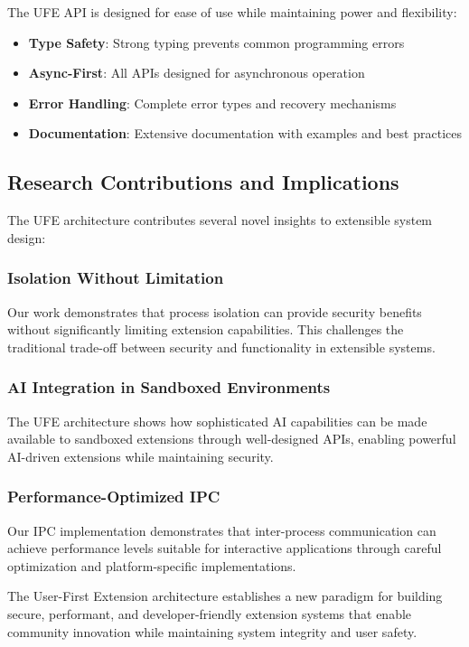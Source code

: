 The UFE API is designed for ease of use while maintaining power and flexibility:

\begin{itemize}
    \item \textbf{Type Safety}: Strong typing prevents common programming errors
    \item \textbf{Async-First}: All APIs designed for asynchronous operation
    \item \textbf{Error Handling}: Complete error types and recovery mechanisms
    \item \textbf{Documentation}: Extensive documentation with examples and best practices
\end{itemize}

\subsection{Research Contributions and Implications}

The UFE architecture contributes several novel insights to extensible system design:

\subsubsection{Isolation Without Limitation}

Our work demonstrates that process isolation can provide security benefits without significantly limiting extension capabilities. This challenges the traditional trade-off between security and functionality in extensible systems.

\subsubsection{AI Integration in Sandboxed Environments}

The UFE architecture shows how sophisticated AI capabilities can be made available to sandboxed extensions through well-designed APIs, enabling powerful AI-driven extensions while maintaining security.

\subsubsection{Performance-Optimized IPC}

Our IPC implementation demonstrates that inter-process communication can achieve performance levels suitable for interactive applications through careful optimization and platform-specific implementations.

The User-First Extension architecture establishes a new paradigm for building secure, performant, and developer-friendly extension systems that enable community innovation while maintaining system integrity and user safety.
